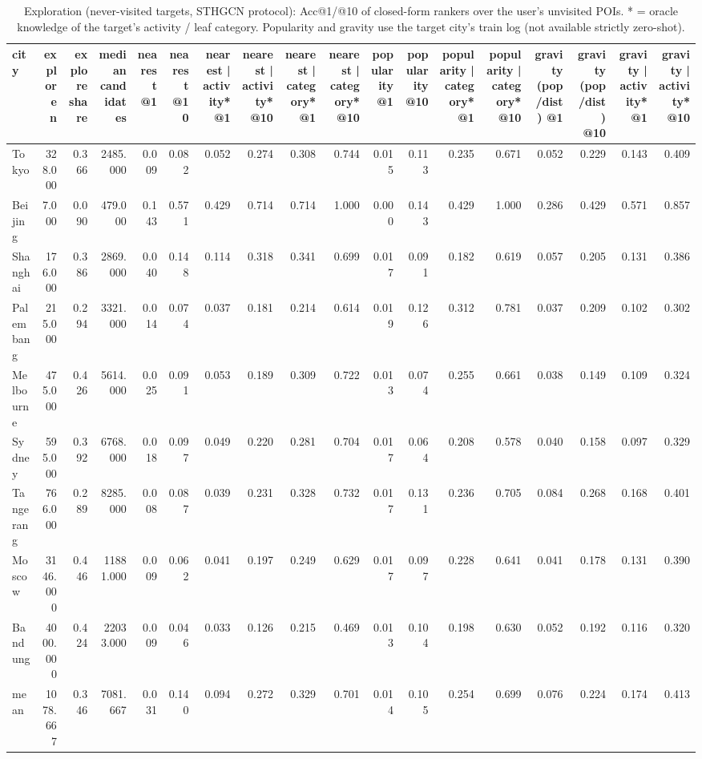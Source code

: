 \begin{table}[t]
\centering\small
\caption{Exploration (never-visited targets, STHGCN protocol): Acc@1/@10 of closed-form rankers over the user's unvisited POIs.  * = oracle knowledge of the target's activity / leaf category.  Popularity and gravity use the target city's train log (not available strictly zero-shot).}
\label{tab:A8_explore_oracles}
\begin{tabular}{lrrrrrrrrrrrrrrrrr}
\toprule
city & explore n & explore share & median candidates & nearest @1 & nearest @10 & nearest | activity* @1 & nearest | activity* @10 & nearest | category* @1 & nearest | category* @10 & popularity @1 & popularity @10 & popularity | category* @1 & popularity | category* @10 & gravity (pop/dist) @1 & gravity (pop/dist) @10 & gravity | activity* @1 & gravity | activity* @10 \\
\midrule
Tokyo & 328.000 & 0.366 & 2485.000 & 0.009 & 0.082 & 0.052 & 0.274 & 0.308 & 0.744 & 0.015 & 0.113 & 0.235 & 0.671 & 0.052 & 0.229 & 0.143 & 0.409 \\
Beijing & 7.000 & 0.090 & 479.000 & 0.143 & 0.571 & 0.429 & 0.714 & 0.714 & 1.000 & 0.000 & 0.143 & 0.429 & 1.000 & 0.286 & 0.429 & 0.571 & 0.857 \\
Shanghai & 176.000 & 0.386 & 2869.000 & 0.040 & 0.148 & 0.114 & 0.318 & 0.341 & 0.699 & 0.017 & 0.091 & 0.182 & 0.619 & 0.057 & 0.205 & 0.131 & 0.386 \\
Palembang & 215.000 & 0.294 & 3321.000 & 0.014 & 0.074 & 0.037 & 0.181 & 0.214 & 0.614 & 0.019 & 0.126 & 0.312 & 0.781 & 0.037 & 0.209 & 0.102 & 0.302 \\
Melbourne & 475.000 & 0.426 & 5614.000 & 0.025 & 0.091 & 0.053 & 0.189 & 0.309 & 0.722 & 0.013 & 0.074 & 0.255 & 0.661 & 0.038 & 0.149 & 0.109 & 0.324 \\
Sydney & 595.000 & 0.392 & 6768.000 & 0.018 & 0.097 & 0.049 & 0.220 & 0.281 & 0.704 & 0.017 & 0.064 & 0.208 & 0.578 & 0.040 & 0.158 & 0.097 & 0.329 \\
Tangerang & 766.000 & 0.289 & 8285.000 & 0.008 & 0.087 & 0.039 & 0.231 & 0.328 & 0.732 & 0.017 & 0.131 & 0.236 & 0.705 & 0.084 & 0.268 & 0.168 & 0.401 \\
Moscow & 3146.000 & 0.446 & 11881.000 & 0.009 & 0.062 & 0.041 & 0.197 & 0.249 & 0.629 & 0.017 & 0.097 & 0.228 & 0.641 & 0.041 & 0.178 & 0.131 & 0.390 \\
Bandung & 4000.000 & 0.424 & 22033.000 & 0.009 & 0.046 & 0.033 & 0.126 & 0.215 & 0.469 & 0.013 & 0.104 & 0.198 & 0.630 & 0.052 & 0.192 & 0.116 & 0.320 \\
mean & 1078.667 & 0.346 & 7081.667 & 0.031 & 0.140 & 0.094 & 0.272 & 0.329 & 0.701 & 0.014 & 0.105 & 0.254 & 0.699 & 0.076 & 0.224 & 0.174 & 0.413 \\
\bottomrule
\end{tabular}
\end{table}
